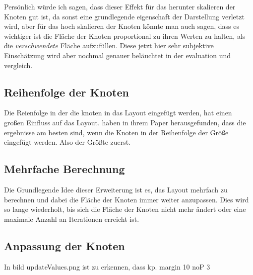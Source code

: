 Persönlich würde ich sagen, dass dieser Effekt für das herunter skalieren der Knoten gut ist, da sonst eine grundlegende eigenschaft der Darstellung verletzt wird, aber für das hoch skalieren der Knoten könnte man auch sagen, dass es wichtiger ist die Fläche der Knoten proportional zu ihren Werten zu halten, als die \textit{verschwendete} Fläche aufzufüllen. Diese jetzt hier sehr subjektive Einschätzung wird aber nochmal genauer beläuchtet in der evaluation und vergleich.

\subsection{Reihenfolge der Knoten} \label{sec:ReihenfolgeKnoten}
Die Reienfolge in der die knoten in das Layout eingefügt werden, hat einen großen Einfluss auf das Layout. \cite{johnson1991tree} haben in ihrem Paper herausgefunden, dass die ergebnisse am besten sind, wenn die Knoten in der Reihenfolge der Größe eingefügt werden. Also der Größte zuerst.

\subsection{Mehrfache Berechnung} \label{sec:MehrfacheBerechnung}
Die Grundlegende Idee dieser Erweiterung ist es, das Layout mehrfach zu berechnen und dabei die Fläche der Knoten immer weiter anzupassen. Dies wird so lange wiederholt, bis sich die Fläche der Knoten nicht mehr ändert oder eine maximale Anzahl an Iterationen erreicht ist.

\subsection{Anpassung der Knoten}
In bild updateValues.png ist zu erkennen, dass kp. margin 10 noP 3

